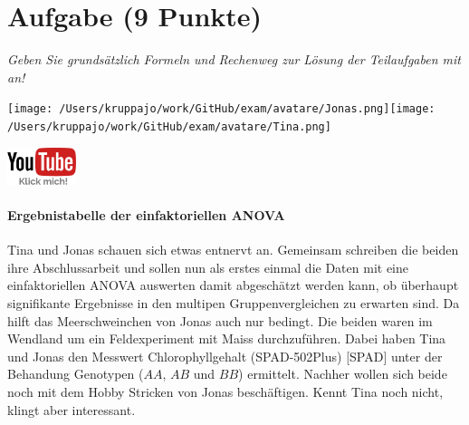\documentclass[a4paper, 9pt]{scrartcl}\usepackage[]{graphicx}\usepackage[]{xcolor}
\begin{document}
\clearpage

\section{Aufgabe \hfill (9 Punkte)}

\textit{Geben Sie grundsätzlich Formeln und Rechenweg zur Lösung der Teilaufgaben mit an!} \\[1Ex]
 

 
\begin{minipage}[t]{0.5\textwidth}
\texttt{[image: /Users/kruppajo/work/GitHub/exam/avatare/Jonas.png]}\hspace{-4mm}\texttt{[image: /Users/kruppajo/work/GitHub/exam/avatare/Tina.png]}
\end{minipage}
\begin{minipage}[t]{0.5\textwidth}
\hfill
\href{https://youtu.be/IhecxMcCENY}{\includegraphics[width = 2cm]{img/youtube}}
\end{minipage}



\paragraph{Ergebnistabelle der einfaktoriellen ANOVA}

Tina und Jonas schauen sich etwas entnervt an. Gemeinsam schreiben die beiden ihre Abschlussarbeit und sollen nun als erstes einmal die Daten mit eine einfaktoriellen ANOVA auswerten damit abgeschätzt werden kann, ob überhaupt signifikante Ergebnisse in den multipen Gruppenvergleichen zu erwarten sind. Da hilft das Meerschweinchen von Jonas auch nur bedingt. Die beiden waren im Wendland um ein Feldexperiment mit Maiss durchzuführen. Dabei haben Tina und Jonas den Messwert Chlorophyllgehalt (SPAD-502Plus) [SPAD] unter der Behandung Genotypen ($AA$, $AB$ und $BB$) ermittelt. Nachher wollen sich beide noch mit dem Hobby Stricken von Jonas beschäftigen. Kennt Tina noch nicht, klingt aber interessant.



\vspace{1ex}
\end{document}
